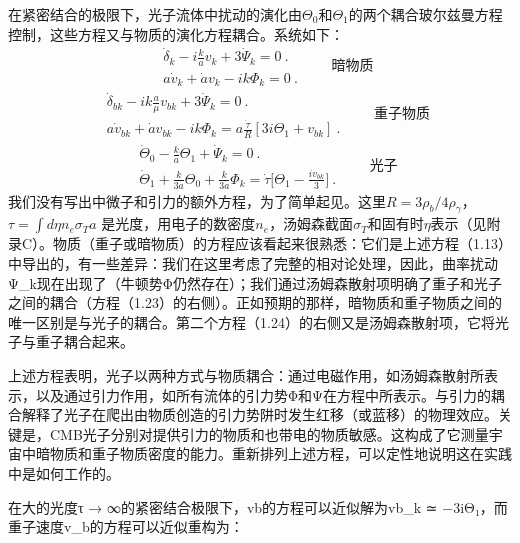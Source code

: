 在紧密结合的极限下，光子流体中扰动的演化由$\Theta_0$和$\Theta_1$的两个耦合玻尔兹曼方程控制，这些方程又与物质的演化方程耦合。系统如下：
\begin{equation}
\begin{aligned}
& \dot{\delta}_k - i \frac{k}{a} v_k + 3 \dot{\Psi}_k = 0~. \\
& a \dot{v}_k + \dot{a} v_k - ik \Phi_k = 0~. 
\end{aligned} \quad \quad \text{暗物质}
\end{equation} 
\begin{equation}
\begin{aligned} 
&\dot{\delta}_{bk} - ik \frac{a}{\mu} v_{bk} + 3 \dot{\Psi}_k = 0~. \\
& a \dot{v}_{bk} + \dot{a} v_{bk} - ik \Phi_k = a  \frac{\dot{\tau}}{R}[3 i \Theta_1 + v_{bk}]~.
\end{aligned} \quad \quad \text{重子物质}
\end{equation}
\begin{equation}
\begin{aligned} 
&\dot{\Theta}_0 -  \frac{k}{a} \Theta_1 + \dot{\Psi}_k = 0~. \\
& \dot{\Theta}_1 +  \frac{k}{3 a} \Theta_0 +  \frac{k}{3 a} \Phi_k = \dot{\tau} \bigg[\Theta_1 -\frac{ i v_{bk}}{3}\bigg]~. 
\end{aligned} \quad \quad \text{光子}
\end{equation} 
我们没有写出中微子和引力的额外方程，为了简单起见。这里$R = 3\rho_b/4\rho_\gamma$，$\tau = \int d\eta n_e \sigma_T a$ 是光度，用电子的数密度$n_e$，汤姆森截面$\sigma_T$和固有时$\eta$表示（见附录C）。物质（重子或暗物质）的方程应该看起来很熟悉：它们是上述方程（1.13）中导出的，有一些差异：我们在这里考虑了完整的相对论处理，因此，曲率扰动Ψ_k现在出现了（牛顿势Φ仍然存在）；我们通过汤姆森散射项明确了重子和光子之间的耦合（方程（1.23）的右侧）。正如预期的那样，暗物质和重子物质之间的唯一区别是与光子的耦合。第二个方程（1.24）的右侧又是汤姆森散射项，它将光子与重子耦合起来。

上述方程表明，光子以两种方式与物质耦合：通过电磁作用，如汤姆森散射所表示，以及通过引力作用，如所有流体的引力势Φ和Ψ在方程中所表示。与引力的耦合解释了光子在爬出由物质创造的引力势阱时发生红移（或蓝移）的物理效应。关键是，CMB光子分别对提供引力的物质和也带电的物质敏感。这构成了它测量宇宙中暗物质和重子物质密度的能力。重新排列上述方程，可以定性地说明这在实践中是如何工作的。

在大的光度τ → ∞的紧密结合极限下，vb的方程可以近似解为vb_k ≃ −3iΘ₁，而重子速度v_b的方程可以近似重构为：

